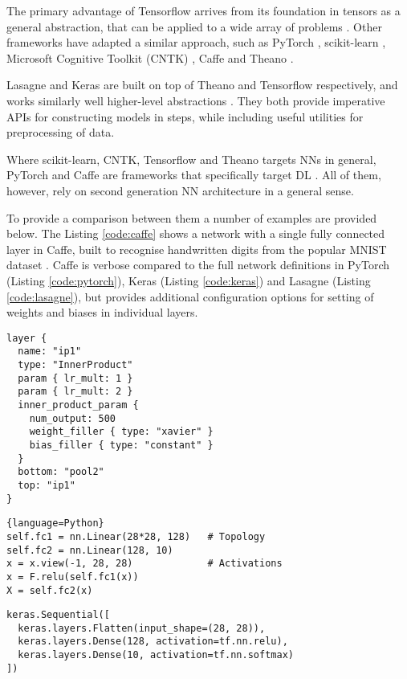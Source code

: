 \documentclass[report.tex]{subfiles}
\begin{document}
The primary advantage of Tensorflow  arrives from 
its foundation in tensors as a general abstraction, that
can be applied to a wide array of problems \cite{Abadi2016}.
Other frameworks have adapted a similar approach, such as PyTorch \cite{PyTorch2018}, 
scikit-learn \cite{Sklearn2018}, Microsoft Cognitive Toolkit (CNTK) \cite{CNTK2018},
Caffe \cite{Caffe2018} and Theano \cite{Theano2018}.

Lasagne and Keras are built on top of Theano and Tensorflow respectively,
and works similarly well higher-level abstractions \cite{Lasagne2018, Keras2018}.
They both provide imperative \gls{API}s for constructing models in steps, while
including useful utilities for preprocessing of data.

Where scikit-learn, CNTK, Tensorflow and Theano targets \glspl{NN} in general,
PyTorch and Caffe are frameworks that specifically target \gls{DL} 
\cite{PyTorch2018, Caffe2018}.
All of them, however, rely on second generation \gls{NN} architecture in a general sense.

To provide a comparison between them a number of examples are provided below.
The Listing \ref{code:caffe} shows a network with a single fully connected
layer in Caffe, built to recognise handwritten digits from the 
popular MNIST dataset \cite{LeCun1998}.
Caffe is verbose compared to the full network definitions in PyTorch 
(Listing \ref{code:pytorch}), Keras (Listing \ref{code:keras}) and
Lasagne (Listing \ref{code:lasagne}), but provides additional 
configuration options for setting of weights and biases in 
individual layers.

\begin{lstlisting}
layer {
  name: "ip1"
  type: "InnerProduct"
  param { lr_mult: 1 }
  param { lr_mult: 2 }
  inner_product_param {
    num_output: 500
    weight_filler { type: "xavier" }
    bias_filler { type: "constant" }
  }
  bottom: "pool2"
  top: "ip1"
}
\end{lstlisting} \label{code:caffe}

\begin{lstlisting}{language=Python}
self.fc1 = nn.Linear(28*28, 128)   # Topology
self.fc2 = nn.Linear(128, 10)
x = x.view(-1, 28, 28)             # Activations
x = F.relu(self.fc1(x))
X = self.fc2(x)
\end{lstlisting} \label{code:pytorch}

\begin{lstlisting}
keras.Sequential([
  keras.layers.Flatten(input_shape=(28, 28)),
  keras.layers.Dense(128, activation=tf.nn.relu),
  keras.layers.Dense(10, activation=tf.nn.softmax)
])
\end{lstlisting} \label{code:keras}
\end{document}
